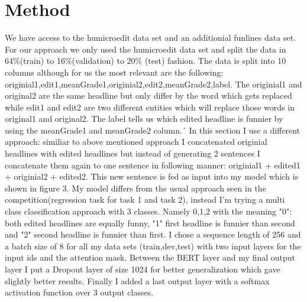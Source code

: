 \documentclass[11pt,a4paper,onecolumn,oneside,notitlepage]{article}
\begin{document}
	\section{Method}
		We have access to the humicroedit data set and an additionial funlines data set.
		For our approach we only used the humicroedit data set and split the data in 64\%(train) to 16\%(validation) to 20\% (test) fashion. The data is split into 10 columns although for us the most relevant are the following: originial1,edit1,meanGrade1,originial2,edit2,meanGrade2,label.
		The originial1 and original2 are the same headline but  only differ by the word which gets replaced while edit1 and edit2 are two different entities which will replace those words in original1 and original2. The label tells us which edited headline is funnier by using the meanGrade1 and meanGrade2 column.´
		In this section I use a different approach: similiar to above mentioned approach I concatenated originial headlines with edited headlines but instead of generating 2 sentences I concatenate them again to one sentence in following manner: originial1 + edited1 + originial2 + edited2.
		This new sentence is fed as input into my model which is shown in figure 3.
		My model differs from the usual approach seen in the competition(regression task for task 1 and task 2), instead I'm trying a multi class classification approach with 3 classes. Namely 0,1,2 with the meaning "0": both edited headlines are equally funny, "1" first headline is funnier than second and "2" second headline is funnier than first.
		I chose a sequence length of 256 and a batch size of 8 for all my data sets (train,dev,test) with two input layers for the input ids and the attention mask.
		Between the BERT layer and my final output layer I put a Dropout layer of size 1024 for better generalization which gave slightly better results. 
		Finally I added a last output layer with a softmax activation function over 3 output classes.
	
\end{document}

